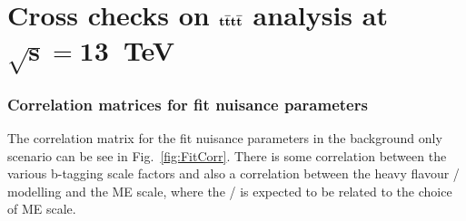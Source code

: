 \appendix

\chapter{Cross checks on \runtwo $\boldsymbol{\mathrm{t}\overline{\mathrm{t}}\mathrm{t}\overline{\mathrm{t}}}$ analysis at $\boldsymbol{\sqrt{s}=13}$~TeV}







\subsection{Correlation matrices for fit nuisance parameters}


The correlation matrix for the fit nuisance parameters in the background only scenario can be see in Fig.~\ref{fig:FitCorr}. There is some correlation between the various b-tagging scale factors and also a correlation between the heavy flavour \heavyflavourone / \heavyflavourtwo modelling and the \ttbar ME scale, where the \heavyflavourone / \heavyflavourtwo is expected to be related to the choice of ME scale.

